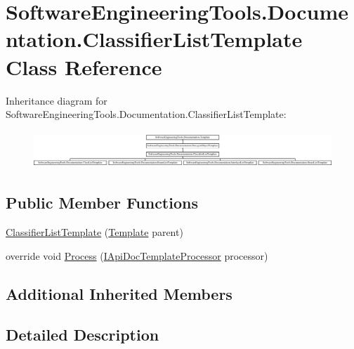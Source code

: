 \hypertarget{class_software_engineering_tools_1_1_documentation_1_1_classifier_list_template}{\section{Software\+Engineering\+Tools.\+Documentation.\+Classifier\+List\+Template Class Reference}
\label{class_software_engineering_tools_1_1_documentation_1_1_classifier_list_template}
}
Inheritance diagram for Software\+Engineering\+Tools.\+Documentation.\+Classifier\+List\+Template\+:\begin{figure}[H]
\begin{center}
\leavevmode
\includegraphics[height=1.414141cm]{class_software_engineering_tools_1_1_documentation_1_1_classifier_list_template}
\end{center}
\end{figure}
\subsection*{Public Member Functions}
\begin{DoxyCompactItemize}
\item 
\hyperlink{class_software_engineering_tools_1_1_documentation_1_1_classifier_list_template_ab6d92fcf3c3f08dcda4a3136a23bbec1}{Classifier\+List\+Template} (\hyperlink{class_software_engineering_tools_1_1_documentation_1_1_template}{Template} parent)
\item 
override void \hyperlink{class_software_engineering_tools_1_1_documentation_1_1_classifier_list_template_a119ae8eeb938465c5aaf44780e2f8876}{Process} (\hyperlink{interface_software_engineering_tools_1_1_documentation_1_1_i_api_doc_template_processor}{I\+Api\+Doc\+Template\+Processor} processor)
\end{DoxyCompactItemize}
\subsection*{Additional Inherited Members}


\subsection{Detailed Description}


